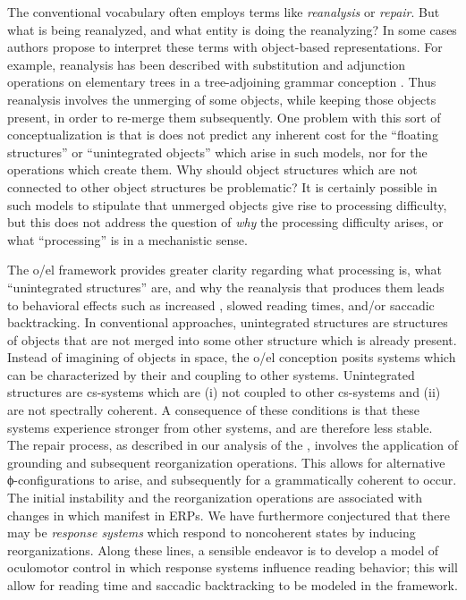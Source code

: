 The conventional vocabulary often employs terms like \textit{reanalysis} or \textit{repair}. But what is being reanalyzed, and what entity is doing the reanalyzing? In some cases authors propose to interpret these terms with object-based representations. For example, reanalysis has been described with substitution and adjunction operations on elementary trees in a tree-adjoining grammar conception \citep{FFerreiraEtAl2004}. Thus reanalysis involves the unmerging of some objects, while keeping those objects present, in order to re-merge them subsequently. One problem with this sort of conceptualization is that is does not predict any inherent cost for the “floating structures” or “unintegrated objects” which arise in such models, nor for the operations which create them. Why should object structures which are not connected to other object structures be problematic? It is certainly possible in such models to stipulate that unmerged objects give rise to processing difficulty, but this does not address the question of \textit{why} the processing difficulty arises, or what “processing” is in a mechanistic sense.

The o/el framework provides greater clarity regarding what processing is, what “unintegrated structures” are, and why the reanalysis that produces them leads to behavioral effects such as increased , slowed reading times, and/or saccadic backtracking. In conventional approaches, unintegrated structures are structures of objects that are not merged into some other structure which is already present. Instead of imagining of objects in space, the o/el conception posits systems which can be characterized by their  and coupling to other systems. Unintegrated structures are cs-systems which are (i) not coupled to other cs-systems and (ii) are not spectrally coherent. A consequence of these conditions is that these systems experience stronger  from other systems, and are therefore less stable. The repair process, as described in our analysis of the , involves the application of grounding and subsequent reorganization operations. This allows for alternative ϕ-configurations to arise, and subsequently for a grammatically coherent  to occur. The initial instability and the reorganization operations are associated with changes in  which manifest in ERPs. We have furthermore conjectured that there may be \textit{ response systems} which respond to noncoherent states by inducing reorganizations. Along these lines, a sensible endeavor is to develop a model of oculomotor control in which  response systems influence reading behavior; this will allow for reading time and saccadic backtracking to be modeled in the framework.

